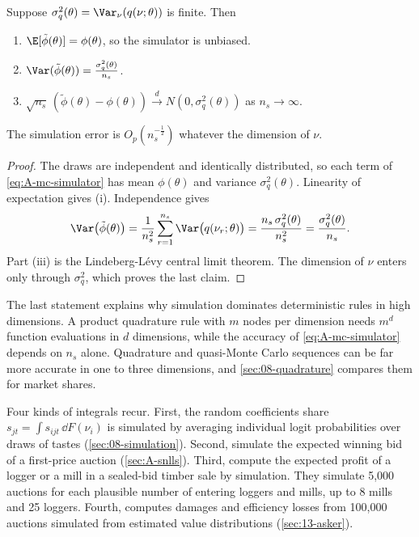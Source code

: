 \begin{proposition}\label{prop:A-mc}
Suppose $\sigma_q^2(\theta) = \Var_\nu(q(\nu;\theta))$ is finite. Then
\begin{enumerate}[label=(\roman*)]
  \item $\E[\tilde\phi(\theta)] = \phi(\theta)$, so the simulator is unbiased.
  \item $\Var(\tilde\phi(\theta)) = \frac{\sigma_q^2(\theta)}{n_s}$.
  \item $\sqrt{n_s}\,(\tilde\phi(\theta) - \phi(\theta)) \xrightarrow{d} N(0, \sigma_q^2(\theta))$ as $n_s \to \infty$.
\end{enumerate}
The simulation error is $O_p(n_s^{-\frac{1}{2}})$ whatever the dimension of $\nu$.
\end{proposition}

\begin{proof}
The draws are independent and identically distributed, so each term of \eqref{eq:A-mc-simulator} has mean
$\phi(\theta)$ and variance $\sigma_q^2(\theta)$. Linearity of expectation gives (i). Independence gives
\begin{equation*}
  \Var\bigl(\tilde\phi(\theta)\bigr) = \frac{1}{n_s^2}\sum_{r=1}^{n_s}\Var\bigl(q(\nu_r;\theta)\bigr)
  = \frac{n_s\,\sigma_q^2(\theta)}{n_s^2} = \frac{\sigma_q^2(\theta)}{n_s}.
\end{equation*}
Part (iii) is the Lindeberg-L\'evy central limit theorem. The dimension of $\nu$ enters only through
$\sigma_q^2$, which proves the last claim.
\end{proof}

The last statement explains why simulation dominates deterministic rules in high dimensions. A product quadrature
rule with $m$ nodes per dimension needs $m^d$ function evaluations in $d$ dimensions, while the accuracy of
\eqref{eq:A-mc-simulator} depends on $n_s$ alone. Quadrature and quasi-Monte Carlo sequences can be far more accurate
in one to three dimensions, and \cref{sec:08-quadrature} compares them for market shares.

Four kinds of integrals recur. First, the random coefficients share $s_{jt} = \int s_{ijt}\,\dd F(\nu_i)$ is simulated
by averaging individual logit probabilities over draws of tastes (\cref{sec:08-simulation}). Second,
\citet{LaffontOssardVuong1995} simulate the expected winning bid of a first-price auction
(\cref{sec:A-snlls}). Third, \citet[p.~245]{AtheyLevinSeira2011} compute the expected profit of a logger or a mill
in a sealed-bid timber sale by simulation. They simulate 5,000 auctions for each plausible number of entering
loggers and mills, up to 8 mills and 25 loggers. Fourth, \citet{Asker2010} computes damages and efficiency losses from 100,000 auctions
simulated from estimated value distributions (\cref{sec:13-asker}).

